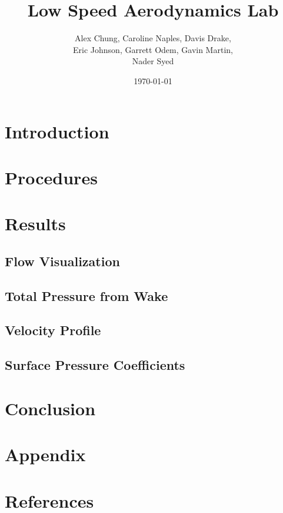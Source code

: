 \documentclass[12pt]{article}
\title{\textbf{Low Speed Aerodynamics Lab}}
\author{
Alex Chung, Caroline Naples, Davis Drake, \\ Eric Johnson, Garrett Odem, Gavin Martin, \\ Nader Syed}
\date{\today}
\begin{document}
\maketitle 
{}
\pagebreak

\tableofcontents
\pagebreak


\section{Introduction}
\section{Procedures}
\section{Results}
\subsection{Flow Visualization}
\subsection{Total Pressure from Wake}
\subsection{Velocity Profile}
\subsection{Surface Pressure Coefficients}
\section{Conclusion}
\section{Appendix}
\section{References}
\end{document}
